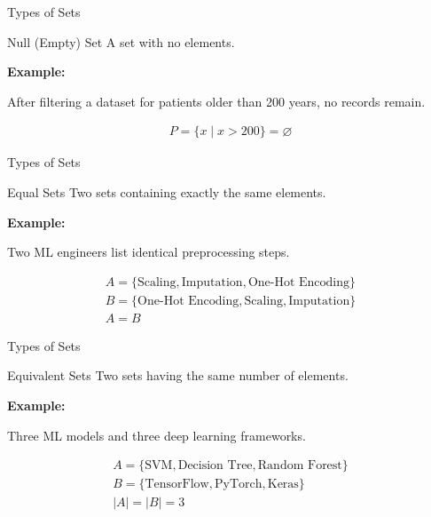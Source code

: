\documentclass{beamer}
\begin{document}
\begin{frame}{Types of Sets}

\begin{block}{Null (Empty) Set}
A set with no elements.
\end{block}

\textbf{Example:}

After filtering a dataset for patients older than 200 years, no records remain.

\begin{gather*}
P=\{x\mid x>200\}=\varnothing
\end{gather*}

\end{frame}

\begin{frame}{Types of Sets}

\begin{block}{Equal Sets}
Two sets containing exactly the same elements.
\end{block}

\textbf{Example:}

Two ML engineers list identical preprocessing steps.

\begin{gather*}
A=\{\text{Scaling},\text{Imputation},
\text{One-Hot Encoding}\}\\
B=\{\text{One-Hot Encoding},
\text{Scaling},
\text{Imputation}\}\\
A=B
\end{gather*}

\end{frame}

\begin{frame}{Types of Sets}

\begin{block}{Equivalent Sets}
Two sets having the same number of elements.
\end{block}

\textbf{Example:}

Three ML models and three deep learning frameworks.

\begin{gather*}
A=\{\text{SVM},
\text{Decision Tree},
\text{Random Forest}\}\\
B=\{\text{TensorFlow},
\text{PyTorch},
\text{Keras}\}\\
|A|=|B|=3
\end{gather*}

\end{frame}
\end{document}
